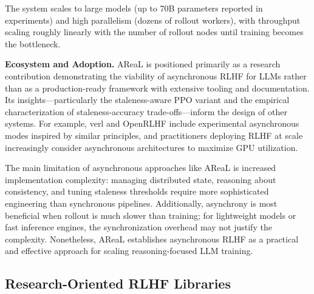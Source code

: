 \documentclass[conference]{IEEEtran}
\begin{document}
The system scales to large models (up to 70B parameters reported in experiments) and high parallelism (dozens of rollout workers), with throughput scaling roughly linearly with the number of rollout nodes until training becomes the bottleneck.

\textbf{Ecosystem and Adoption.} AReaL is positioned primarily as a research contribution demonstrating the viability of asynchronous RLHF for LLMs rather than as a production-ready framework with extensive tooling and documentation. Its insights—particularly the staleness-aware PPO variant and the empirical characterization of staleness-accuracy trade-offs—inform the design of other systems. For example, verl and OpenRLHF include experimental asynchronous modes inspired by similar principles, and practitioners deploying RLHF at scale increasingly consider asynchronous architectures to maximize GPU utilization.

The main limitation of asynchronous approaches like AReaL is increased implementation complexity: managing distributed state, reasoning about consistency, and tuning staleness thresholds require more sophisticated engineering than synchronous pipelines. Additionally, asynchrony is most beneficial when rollout is much slower than training; for lightweight models or fast inference engines, the synchronization overhead may not justify the complexity. Nonetheless, AReaL establishes asynchronous RLHF as a practical and effective approach for scaling reasoning-focused LLM training.


\subsection{Research-Oriented RLHF Libraries}
\end{document}
